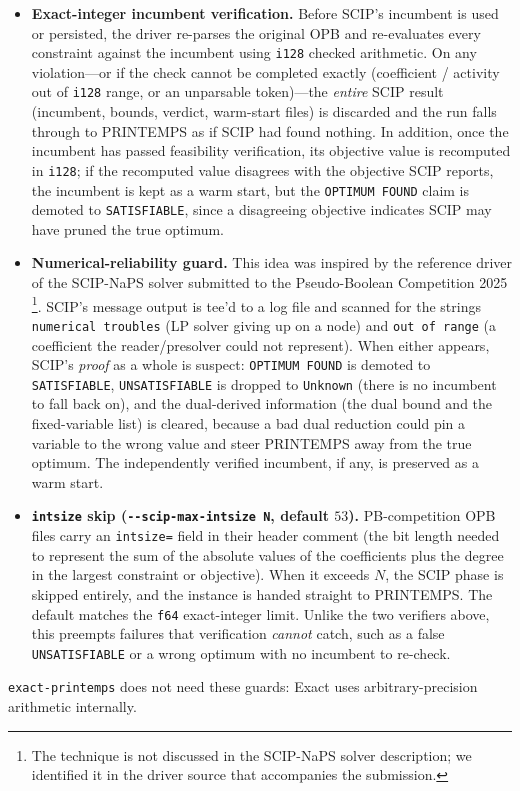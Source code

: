 \documentclass[conference]{IEEEtran}
\begin{document}
\begin{itemize}
\item \textbf{Exact-integer incumbent verification.} Before SCIP's incumbent is used or persisted, the driver re-parses the original OPB and re-evaluates every constraint against the incumbent using \texttt{i128} checked arithmetic. On any violation---or if the check cannot be completed exactly (coefficient / activity out of \texttt{i128} range, or an unparsable token)---the \emph{entire} SCIP result (incumbent, bounds, verdict, warm-start files) is discarded and the run falls through to PRINTEMPS as if SCIP had found nothing. In addition, once the incumbent has passed feasibility verification, its objective value is recomputed in \texttt{i128}; if the recomputed value disagrees with the objective SCIP reports, the incumbent is kept as a warm start, but the \texttt{OPTIMUM FOUND} claim is demoted to \texttt{SATISFIABLE}, since a disagreeing objective indicates SCIP may have pruned the true optimum.
\item \textbf{Numerical-reliability guard.} This idea was inspired by the reference driver of the SCIP-NaPS solver submitted to the Pseudo-Boolean Competition 2025 \cite{scip-naps}\footnote{The technique is not discussed in the SCIP-NaPS solver description; we identified it in the driver source that accompanies the submission.}. SCIP's message output is tee'd to a log file and scanned for the strings \texttt{numerical troubles} (LP solver giving up on a node) and \texttt{out of range} (a coefficient the reader/presolver could not represent). When either appears, SCIP's \emph{proof} as a whole is suspect: \texttt{OPTIMUM FOUND} is demoted to \texttt{SATISFIABLE}, \texttt{UNSATISFIABLE} is dropped to \texttt{Unknown} (there is no incumbent to fall back on), and the dual-derived information (the dual bound and the fixed-variable list) is cleared, because a bad dual reduction could pin a variable to the wrong value and steer PRINTEMPS away from the true optimum. The independently verified incumbent, if any, is preserved as a warm start.
\item \textbf{\texttt{intsize} skip (\texttt{-{}-scip-max-intsize N}, default $53$).} PB-competition OPB files carry an \texttt{intsize=} field in their header comment (the bit length needed to represent the sum of the absolute values of the coefficients plus the degree in the largest constraint or objective). When it exceeds $N$, the SCIP phase is skipped entirely, and the instance is handed straight to PRINTEMPS. The default matches the \texttt{f64} exact-integer limit. Unlike the two verifiers above, this preempts failures that verification \emph{cannot} catch, such as a false \texttt{UNSATISFIABLE} or a wrong optimum with no incumbent to re-check.
\end{itemize}
\texttt{exact-printemps} does not need these guards: Exact uses arbitrary-precision arithmetic internally.
\end{document}
